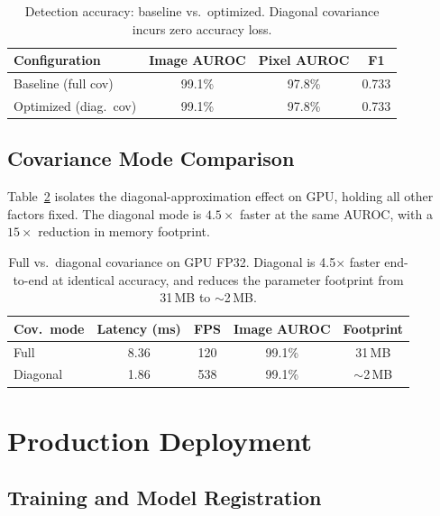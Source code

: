 \documentclass[blind]{gtac}
\begin{document}
\begin{table}[H]
\centering
\caption{Detection accuracy: baseline vs.\ optimized.
Diagonal covariance incurs zero accuracy loss.}
\label{tab:accuracy}
\footnotesize
\begin{tabular}{@{}lccc@{}}
\toprule
Configuration           & Image AUROC & Pixel AUROC & F1    \\
\midrule
Baseline (full cov)     & 99.1\%      & 97.8\%      & 0.733 \\
Optimized (diag.\ cov)  & 99.1\%      & 97.8\%      & 0.733 \\
\bottomrule
\end{tabular}
\end{table}

\subsection{Covariance Mode Comparison}

Table~\ref{tab:covmode} isolates the diagonal-approximation effect on GPU,
holding all other factors fixed.  The diagonal mode is $4.5\times$ faster at
the same AUROC, with a $15\times$ reduction in memory footprint.

\begin{table}[H]
\centering
\caption{Full vs.\ diagonal covariance on GPU FP32.  Diagonal is
4.5$\times$ faster end-to-end at identical accuracy, and reduces the
parameter footprint from 31\,MB to $\sim$2\,MB.}
\label{tab:covmode}
\footnotesize
\begin{tabular}{@{}lcccc@{}}
\toprule
Cov.\ mode & Latency (ms) & FPS & Image AUROC & Footprint \\
\midrule
Full       & 8.36   & 120 & 99.1\% & 31\,MB \\
Diagonal   & 1.86   & 538 & 99.1\% & $\sim$2\,MB \\
\bottomrule
\end{tabular}
\end{table}

\section{Production Deployment}
\label{sec:deployment}

\subsection{Training and Model Registration}
\end{document}
